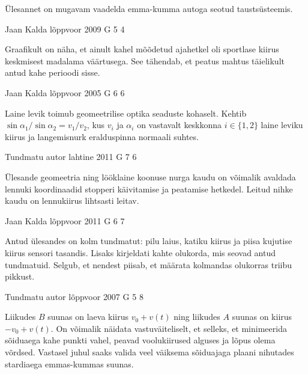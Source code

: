 \documentclass[11pt]{article}
\begin{document}
{{\ifHint
Ülesannet on mugavam vaadelda emma-kumma autoga seotud taustsüsteemis.
\fi
}

{Jaan Kalda} %
{lõppvoor} %
{2009} %
{G 5} %
{4} %
{

\ifHint
Graafikult on näha, et ainult kahel mõõdetud ajahetkel oli sportlase kiirus keskmisest madalama väärtusega. See tähendab, et peatus mahtus täielikult antud kahe perioodi sisse.
\fi
}

{Jaan Kalda} %
{lõppvoor} %
{2005} %
{G 6} %
{6} %
{

\ifHint
Laine levik toimub geomeetrilise optika seaduste kohaselt. Kehtib $\sin \alpha_{1}/\sin \alpha_{2}=v_{1}/v_{2}$, kus $v_i$ ja $\alpha_i$ on vastavalt keskkonna $i\in \{1, 2\}$ laine leviku kiirus ja langemisnurk eralduspinna normaali suhtes.
\fi
}

{Tundmatu autor} %
{lahtine} %
{2011} %
{G 7} %
{6} %
{

\ifHint
Ülesande geomeetria ning lööklaine koonuse nurga kaudu on võimalik avaldada lennuki koordinaadid stopperi käivitamise ja peatamise hetkedel. Leitud nihke kaudu on lennukiirus lihtsasti leitav.
\fi
}

{Jaan Kalda} %
{lõppvoor} %
{2011} %
{G 6} %
{7} %
{

\ifHint
Antud ülesandes on kolm tundmatut: pilu laius, katiku kiirus ja piisa kujutise kiirus sensori tasandis. Lisaks kirjeldati kahte olukorda, mis seovad antud tundmatuid. Selgub, et nendest piisab, et määrata kolmandas olukorras triibu pikkust.
\fi
}

{Tundmatu autor} %
{lõppvoor} %
{2007} %
{G 5} %
{8} %
{

\ifHint
Liikudes $B$ suunas on laeva kiirus $v_0 + v(t)$ ning liikudes $A$ suunas on kiirus $-v_0 + v(t)$. On võimalik näidata vastuväiteliselt, et selleks, et minimeerida sõiduaega kahe punkti vahel, peavad voolukiirused alguses ja lõpus olema võrdsed. Vastasel juhul saaks valida veel väiksema sõiduajaga plaani nihutades stardiaega emmas-kummas suunas.
\fi
}

}
\end{document}

